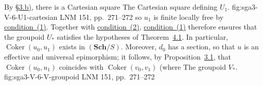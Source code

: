 By \hyperref[par:sga3-V-3-b]{\S3.b)}, there is a Cartesian square
  {The Cartesian square defining \(U_1\).}
  {fig:sga3-V-6-U1-cartesian}
  {LNM 151, pp.~271--272}
so \(u_1\) is finite locally free by \hyperref[def:sga3-V-6-quasisection-1]{condition~(1)}.
Together with \hyperref[def:sga3-V-6-quasisection-2]{condition~(2)}, \hyperref[def:sga3-V-6-quasisection-1]{condition~(1)} therefore ensures that the
groupoid \(U_\ast\) satisfies the hypotheses of
Theorem~\hyperref[thm:sga3-V-4.1]{4.1}. In particular,
\(\operatorname{Coker}(u_0,u_1)\) exists in \((\mathbf{Sch}/S)\).
Moreover, \(d_0\) has a section, so that \(u\) is an effective and universal
epimorphism; it follows, by Proposition~\hyperref[prop:sga3-V-3.1]{3.1}, that
\(\operatorname{Coker}(u_0,u_1)\) coincides with
\(\operatorname{Coker}(v_0,v_1)\) (where
  {The groupoid \(V_\ast\).}
  {fig:sga3-V-6-V-groupoid}
  {LNM 151, pp.~271--272}
